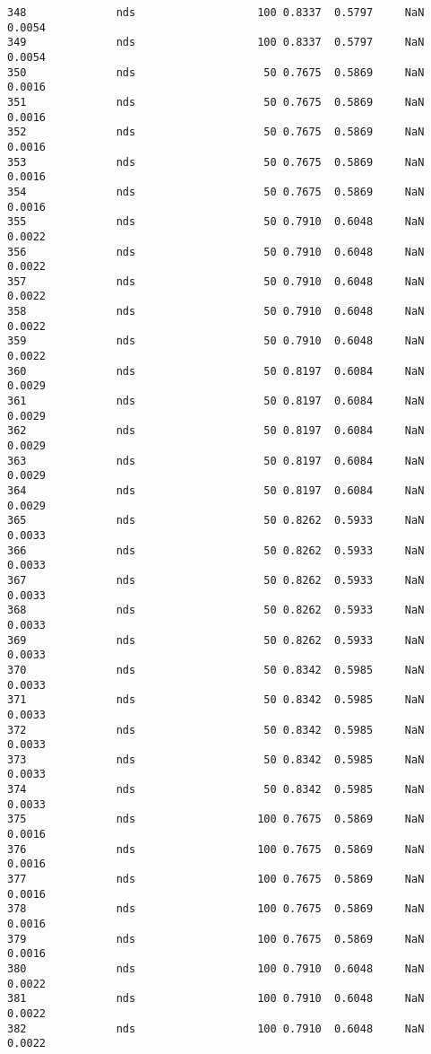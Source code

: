 \documentclass[11pt]{article}
\begin{document}
\begin{Verbatim}[commandchars=\\\{\}]
348              nds                   100 0.8337  0.5797     NaN 0.0054   
349              nds                   100 0.8337  0.5797     NaN 0.0054   
350              nds                    50 0.7675  0.5869     NaN 0.0016   
351              nds                    50 0.7675  0.5869     NaN 0.0016   
352              nds                    50 0.7675  0.5869     NaN 0.0016   
353              nds                    50 0.7675  0.5869     NaN 0.0016   
354              nds                    50 0.7675  0.5869     NaN 0.0016   
355              nds                    50 0.7910  0.6048     NaN 0.0022   
356              nds                    50 0.7910  0.6048     NaN 0.0022   
357              nds                    50 0.7910  0.6048     NaN 0.0022   
358              nds                    50 0.7910  0.6048     NaN 0.0022   
359              nds                    50 0.7910  0.6048     NaN 0.0022   
360              nds                    50 0.8197  0.6084     NaN 0.0029   
361              nds                    50 0.8197  0.6084     NaN 0.0029   
362              nds                    50 0.8197  0.6084     NaN 0.0029   
363              nds                    50 0.8197  0.6084     NaN 0.0029   
364              nds                    50 0.8197  0.6084     NaN 0.0029   
365              nds                    50 0.8262  0.5933     NaN 0.0033   
366              nds                    50 0.8262  0.5933     NaN 0.0033   
367              nds                    50 0.8262  0.5933     NaN 0.0033   
368              nds                    50 0.8262  0.5933     NaN 0.0033   
369              nds                    50 0.8262  0.5933     NaN 0.0033   
370              nds                    50 0.8342  0.5985     NaN 0.0033   
371              nds                    50 0.8342  0.5985     NaN 0.0033   
372              nds                    50 0.8342  0.5985     NaN 0.0033   
373              nds                    50 0.8342  0.5985     NaN 0.0033   
374              nds                    50 0.8342  0.5985     NaN 0.0033   
375              nds                   100 0.7675  0.5869     NaN 0.0016   
376              nds                   100 0.7675  0.5869     NaN 0.0016   
377              nds                   100 0.7675  0.5869     NaN 0.0016   
378              nds                   100 0.7675  0.5869     NaN 0.0016   
379              nds                   100 0.7675  0.5869     NaN 0.0016   
380              nds                   100 0.7910  0.6048     NaN 0.0022   
381              nds                   100 0.7910  0.6048     NaN 0.0022   
382              nds                   100 0.7910  0.6048     NaN 0.0022   

\end{Verbatim}
\end{document}
